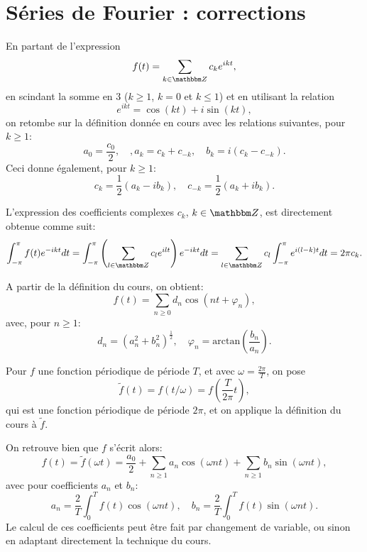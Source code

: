 


\newcommand{\eps}{\varepsilon}




\parindent0mm

\section{Séries de Fourier : corrections}

\begin{exercice} 

En partant de l'expression 
\[
 f(t) = \sum_{k\in\eZ} c_k e^{ikt},
\]
en scindant la somme en 3 ($k\geq1$, $k=0$ et $k\leq1$) et en utilisant la relation
\[
 e^{ikt} = \cos(kt) + i \sin(kt),
\]
on retombe sur la définition donnée en cours avec les relations suivantes, pour $k\geq1$:
\[
 a_0 = \frac{c_0}2,\quad, a_k = c_k + c_{-k},\quad b_k = i ( c_k - c_{-k}).
\]
Ceci donne également, pour $k\geq1$:
\[
 c_k = \frac12 ( a_k - i b_k),\quad c_{-k} = \frac12 ( a_k + i b_k).
\]

L'expression des coefficients complexes $c_k$, $k \in \eZ$, est directement obtenue comme suit:
\[
 \int_{-\pi}^{\pi} f(t) e^{-ikt} dt 
 = \int_{-\pi}^{\pi} \left ( \sum_{l\in\eZ} c_l e^{ilt} \right ) e^{-ikt} dt
 = \sum_{l \in \eZ} c_l \int_{-\pi}^{\pi} e^{i(l-k)t} dt = 2 \pi c_k.
\]

\end{exercice}

\medskip

\begin{exercice}

A partir de la définition du cours, on obtient:
\[
 f(t) = \sum_{n\geq 0} d_n \cos( n t + \varphi_n),
\]
avec, pour $n\geq1$:
\[
 d_n = \left ( a_n^2 + b_n^2 \right )^{\frac12}, \quad \varphi_n = \mbox{arctan} \left( \frac{b_n}{a_n} \right ).
\]
\end{exercice}

\medskip

\begin{exercice}

Pour $f$ une fonction périodique de période $T$, et avec 
$ \omega = \frac{2\pi}T $, on pose
\[
\tilde{f} ( t ) = f( t / \omega )  = f \left ( \frac{T}{2\pi} t \right ), 
\]
qui est une fonction périodique de période $2 \pi$, et on applique la définition du cours à $\tilde{f}$.

On retrouve bien que $f$ s'écrit alors:
\[
 f(t) = \tilde{f} (\omega t) = \frac{a_0}{2} + \sum_{n \geq 1} a_n \cos(\omega n t) + \sum_{n \geq 1} b_n \sin(\omega n t),
\]
avec pour coefficients $a_n$ et $b_n$:
\[
 a_n = \frac2T \int_0^T f(t) \cos(\omega n t), \quad b_n = \frac2T \int_0^T f(t) \sin(\omega n t).
\]
Le calcul de ces coefficients peut être fait par changement de variable, ou sinon en adaptant directement la technique du cours.

\end{exercice}

